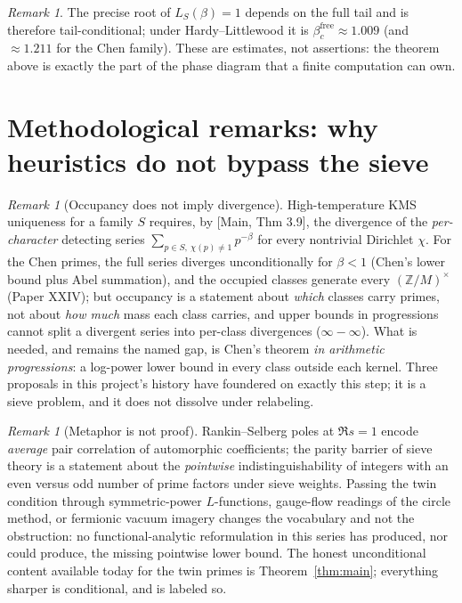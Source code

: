 \documentclass[11pt]{amsart}
\theoremstyle{remark}
\newtheorem{remark}[theorem]{Remark}
\begin{document}
\begin{remark}
The precise root of $L_S(\beta)=1$ depends on the full tail and is therefore
tail-conditional; under Hardy--Littlewood it is $\beta_c^{\mathrm{free}}\approx1.009$
(and $\approx1.211$ for the Chen family). These are estimates, not assertions: the
theorem above is exactly the part of the phase diagram that a finite computation can own.
\end{remark}

\section{Methodological remarks: why heuristics do not bypass the sieve}\label{sec:method}

\begin{remark}[Occupancy does not imply divergence]\label{rem:occupancy}
High-temperature KMS uniqueness for a family $S$ requires, by [Main, Thm 3.9], the
divergence of the \emph{per-character} detecting series
$\sum_{p\in S,\ \chi(p)\ne1}p^{-\beta}$ for every nontrivial Dirichlet $\chi$. For the
Chen primes, the full series diverges unconditionally for $\beta<1$ (Chen's lower bound
plus Abel summation), and the occupied classes generate every $(\mathbb Z/M)^\times$
(Paper XXIV); but occupancy is a statement about \emph{which} classes carry primes, not
about \emph{how much} mass each class carries, and upper bounds in progressions cannot
split a divergent series into per-class divergences ($\infty-\infty$). What is needed,
and remains the named gap, is Chen's theorem \emph{in arithmetic progressions}: a
log-power lower bound in every class outside each kernel. Three proposals in this
project's history have foundered on exactly this step; it is a sieve problem, and it does
not dissolve under relabeling.
\end{remark}

\begin{remark}[Metaphor is not proof]\label{rem:metaphor}
Rankin--Selberg poles at $\Re s=1$ encode \emph{average} pair correlation of automorphic
coefficients; the parity barrier of sieve theory is a statement about the
\emph{pointwise} indistinguishability of integers with an even versus odd number of prime
factors under sieve weights. Passing the twin condition through symmetric-power
$L$-functions, gauge-flow readings of the circle method, or fermionic vacuum imagery
changes the vocabulary and not the obstruction: no functional-analytic reformulation in
this series has produced, nor could produce, the missing pointwise lower bound. The
honest unconditional content available today for the twin primes is
Theorem~\ref{thm:main}; everything sharper is conditional, and is labeled so.
\end{remark}
\end{document}
